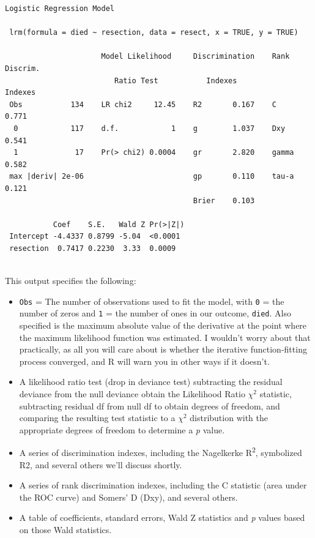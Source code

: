 \documentclass[]{book}
\providecommand{\tightlist}{%
  \setlength{\itemsep}{0pt}\setlength{\parskip}{0pt}}
\theoremstyle{definition}
\theoremstyle{definition}
\theoremstyle{definition}
\theoremstyle{remark}
\begin{document}
\begin{verbatim}
Logistic Regression Model
 
 lrm(formula = died ~ resection, data = resect, x = TRUE, y = TRUE)
 
                      Model Likelihood     Discrimination    Rank Discrim.    
                         Ratio Test           Indexes           Indexes       
 Obs           134    LR chi2     12.45    R2       0.167    C       0.771    
  0            117    d.f.            1    g        1.037    Dxy     0.541    
  1             17    Pr(> chi2) 0.0004    gr       2.820    gamma   0.582    
 max |deriv| 2e-06                         gp       0.110    tau-a   0.121    
                                           Brier    0.103                     
 
           Coef    S.E.   Wald Z Pr(>|Z|)
 Intercept -4.4337 0.8799 -5.04  <0.0001 
 resection  0.7417 0.2230  3.33  0.0009  
 
\end{verbatim}

This output specifies the following:

\begin{itemize}
\tightlist
\item
  \texttt{Obs} = The number of observations used to fit the model, with
  \texttt{0} = the number of zeros and \texttt{1} = the number of ones
  in our outcome, \texttt{died}. Also specified is the maximum absolute
  value of the derivative at the point where the maximum likelihood
  function was estimated. I wouldn't worry about that practically, as
  all you will care about is whether the iterative function-fitting
  process converged, and R will warn you in other ways if it doesn't.
\item
  A likelihood ratio test (drop in deviance test) subtracting the
  residual deviance from the null deviance obtain the Likelihood Ratio
  \(\chi^2\) statistic, subtracting residual df from null df to obtain
  degrees of freedom, and comparing the resulting test statistic to a
  \(\chi^2\) distribution with the appropriate degrees of freedom to
  determine a \emph{p} value.
\item
  A series of discrimination indexes, including the Nagelkerke
  R\textsuperscript{2}, symbolized R2, and several others we'll discuss
  shortly.
\item
  A series of rank discrimination indexes, including the C statistic
  (area under the ROC curve) and Somers' D (Dxy), and several others.
\item
  A table of coefficients, standard errors, Wald Z statistics and
  \emph{p} values based on those Wald statistics.
\end{itemize}
\end{document}
